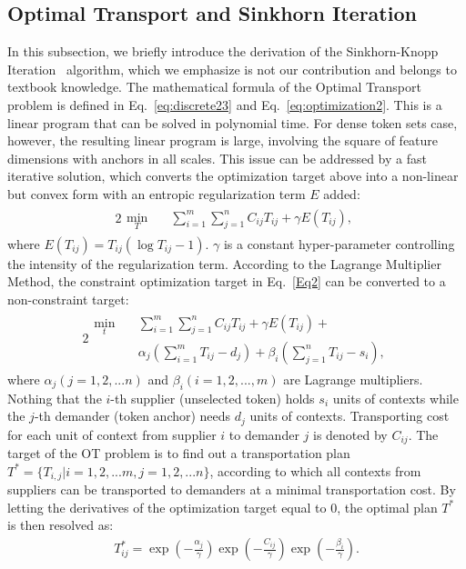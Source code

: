 \subsection{Optimal Transport and Sinkhorn Iteration}
\label{sec:sinkhorn}

In this subsection, we briefly introduce the derivation of the Sinkhorn-Knopp Iteration~\cite{cuturi2013sinkhorn} algorithm, which we emphasize is not our contribution and belongs to textbook knowledge.
The mathematical formula of the Optimal Transport problem is defined in Eq.~\ref{eq:discrete23} and Eq.~\ref{eq:optimization2}. This is a linear program that can be solved in polynomial time. For dense token sets case, however, the resulting linear program is large, involving the square of feature dimensions with anchors in all scales. This issue can be addressed by a fast iterative solution, which converts the optimization target above into a non-linear but convex form with an entropic regularization term $E$ added:
\begin{alignat}{2}
\begin{split}
\min_{T}\quad &\sum\limits_{i=1}^{m}\sum\limits_{j=1}^{n} C_{ij}T_{ij} + \gamma E(T_{ij}),
\end{split}
\label{Eq2}
\end{alignat}
where $E(T_{ij})=T_{ij} (\log T_{ij}-1)$. $\gamma$ is a constant hyper-parameter controlling the intensity of the regularization term. According to the Lagrange Multiplier Method, the constraint optimization target in Eq.~\ref{Eq2} can be converted to a non-constraint target:
\begin{alignat}{2}
\begin{split}
    \min_{t}\quad & \sum\limits_{i=1}^{m}\sum\limits_{j=1}^{n} C_{ij}T_{ij} + \gamma E(T_{ij}) + \\ 
    & \alpha_j(\sum\limits_{i=1}^{m} T_{ij} - d_j) + \beta_i(\sum\limits_{j=1}^{n} T_{ij} - s_i),
\end{split}
\end{alignat}
where $\alpha_j (j=1,2,...n)$ and $\beta_i (i=1,2,...,m)$ are Lagrange multipliers. 
Nothing that the $i$-th supplier (unselected token) holds $s_i$ units of contexts while the $j$-th demander (token anchor) needs $d_j$ units of contexts. Transporting cost for each unit of context from supplier $i$ to demander $j$ is denoted by $C_{ij}$. The target of the OT problem is to find out a transportation plan $T^{*}=\{T_{i,j} | i=1,2,...m, j=1,2,...n\}$, according to which all contexts from suppliers can be transported to demanders at a minimal transportation cost. 
By letting the derivatives of the optimization target equal to 0, the optimal plan $T^{*}$ is then resolved as:
\begin{equation}
\begin{split}
    T_{ij}^{*} = \exp(-{\frac{\alpha_j}{\gamma}})\exp(-{\frac{C_{ij}}{\gamma}})\exp(-{\frac{\beta_i}{\gamma}}).
\end{split}
\end{equation}


